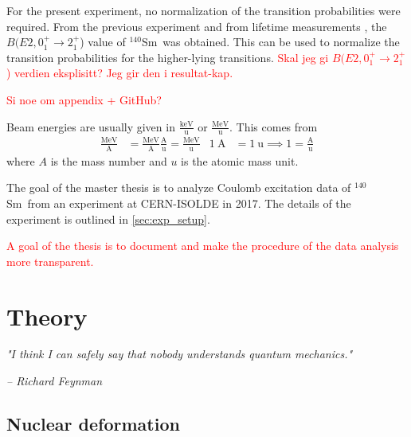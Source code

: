 \documentclass[twoside,english]{uiofysmaster/uiofysmaster}
\newcommand{\Sm}{$^{140}$Sm} %
\let\orgautoref\autoref
\renewcommand{\autoref}
        {%
		 \def\sectionautorefname{Section}%
		 \def\subsectionautorefname{Section}%
		 \def\subsubsectionautorefname{Section}%
		 \def\chapterautorefname{Chapter}%
          \orgautoref}
\begin{document}
For the present experiment, no normalization of the transition probabilities were required.
From the previous experiment \cite{Klintefjord2016} and from lifetime measurements \cite{BelloGarrote2015}, the $B(E2, 0_1^+ \rightarrow 2_1^+$) value of \Sm\ was obtained. 
This can be used to normalize the transition probabilities for the higher-lying transitions.
\textcolor{red}{Skal jeg gi $B(E2, 0_1^+ \rightarrow 2_1^+$) verdien eksplisitt? Jeg gir den i resultat-kap.}




\bigskip

\textcolor{red}{Si noe om appendix + GitHub?}

Beam energies are usually given in $\frac{\text{keV}}{\text{u}}$ or $\frac{\text{MeV}}{\text{u}}$.
This comes from 
\begin{align}
	\frac{\text{MeV}}{\text{A}} &= \frac{\text{MeV}}{\text{A}}  \frac{\text{A}}{\text{u}} = \frac{\text{MeV}}{\text{u}}  &  1 ~\text{A} &= 1 ~\text{u} \implies 1 = \frac{\text{A}}{\text{u}}
\end{align}
where $A$ is the mass number and $u$ is the atomic mass unit.

\bigskip

The goal of the master thesis is to analyze Coulomb excitation data of \Sm\ from an experiment at CERN-ISOLDE in 2017. The details of the experiment is outlined in \autoref{sec:exp_setup}. 

\bigskip

\textcolor{red}{A goal of the thesis is to document and make the procedure of the data analysis more transparent.}


\chapter{Theory}\label{ch:theory}
\epigraph{\textit{"I think I can safely say that nobody understands quantum mechanics."}}{\textit{– Richard Feynman}}


\section{Nuclear deformation}\label{sec:deformation}
\end{document}
